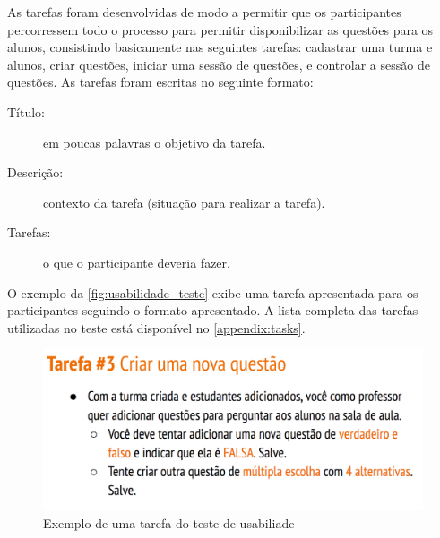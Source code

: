 As tarefas foram desenvolvidas de modo a permitir que os participantes
percorressem todo o processo para permitir disponibilizar as questões para os alunos,
consistindo basicamente nas seguintes tarefas: cadastrar uma turma e alunos, criar questões, iniciar uma sessão de questões,
e controlar a sessão de questões. As tarefas foram escritas no seguinte formato:

\begin{description}
  \item[Título:] em poucas palavras o objetivo da tarefa.
  \item[Descrição:] contexto da tarefa (situação para realizar a tarefa).
  \item[Tarefas:] o que o participante deveria fazer.
\end{description}

O exemplo da \autoref{fig:usabilidade_teste} exibe uma tarefa apresentada para
os participantes seguindo o formato apresentado. A lista completa das tarefas
utilizadas no teste está disponível no \autoref{appendix:tasks}.

\begin{figure}[!ht]
  \centering
  \caption{Exemplo de uma tarefa do teste de usabiliade}
  \label{fig:usabilidade_teste}
  \includegraphics[scale=0.23,valign=t]{imagens/usability_task}
  \doautor
\end{figure}
\clearpage

